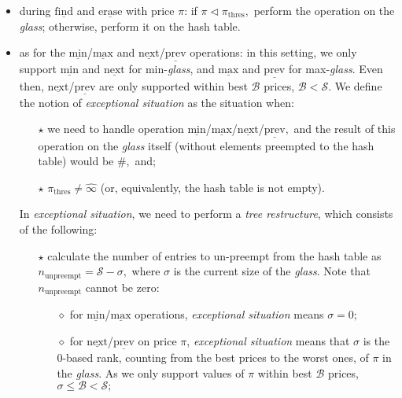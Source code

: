 \documentclass[a4paper,12pt]{article}
\newcommand{\PriceBetter}{\vartriangleleft}
\begin{document}
\begin{itemize}
    \item during $\underline{\mathrm{find}}$ and $\underline{\mathrm{erase}}$ with price $\pi$:
        if $\pi \PriceBetter \pi_\mathrm{thres},$ perform the operation on the \textit{glass}; otherwise, perform it on the hash table.

    \item as for the $\underline{\mathrm{min}}$/$\underline{\mathrm{max}}$ and $\underline{\mathrm{next}}$/$\underline{\mathrm{prev}}$
    operations: in this setting, we only support $\underline{\mathrm{min}}$ and $\underline{\mathrm{next}}$ for min-\textit{glass},
    and $\underline{\mathrm{max}}$ and $\underline{\mathrm{prev}}$ for max-\textit{glass}.
    Even then, $\underline{\mathrm{next}}$/$\underline{\mathrm{prev}}$ are only supported within best $\mathcal{B}$ prices, $\mathcal{B} < \mathcal{S}.$
    We define the notion of \textit{exceptional situation} as the situation when:
        \begin{itemize}
            \item[$\star$] we need to handle operation $\underline{\mathrm{min}}$/$\underline{\mathrm{max}}$/$\underline{\mathrm{next}}$/$\underline{\mathrm{prev}},$
                and the result of this operation on the \textit{glass} itself (without elements preempted to the hash table) would be $\#,$ and;
            \item[$\star$] $\pi_\mathrm{thres} \ne \widehat \infty$ (or, equivalently, the hash table is not empty).
        \end{itemize}

    In \textit{exceptional situation}, we need to perform a \textit{tree restructure}, which consists of the following:
        \begin{itemize}
            \item[$\star$] calculate the number of entries to un-preempt from the hash table as $n_\mathrm{unpreempt} = \mathcal{S} - \sigma,$
            where $\sigma$ is the current size of the \textit{glass}.
            Note that $n_\mathrm{unpreempt}$ cannot be zero:
            \begin{itemize}
                \item[$\diamond$] for $\underline{\mathrm{min}}$/$\underline{\mathrm{max}}$ operations, \textit{exceptional situation} means $\sigma = 0;$
                \item[$\diamond$] for $\underline{\mathrm{next}}$/$\underline{\mathrm{prev}}$ on price $\pi$, \textit{exceptional situation} means that $\sigma$
                    is the 0-based rank, counting from the best prices to the worst ones, of $\pi$ in the \textit{glass}.
                    As we only support values of $\pi$ within best $\mathcal{B}$ prices, $\sigma \le \mathcal{B} < \mathcal{S};$
            \end{itemize}


\end{itemize}
\end{itemize}
\end{document}
